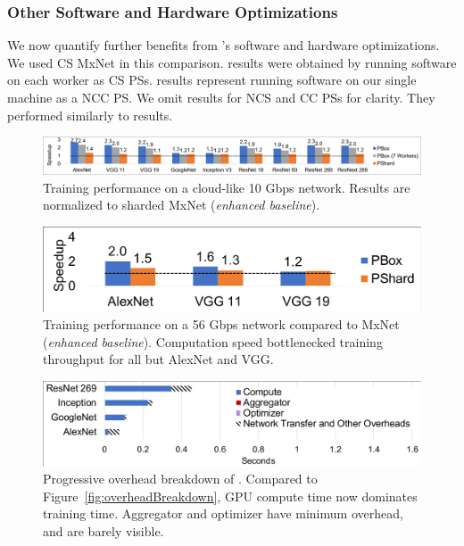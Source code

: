 \subsubsection{Other Software and Hardware Optimizations}
We now quantify further benefits from \phub{}'s software and hardware optimizations. 
We used CS MxNet in this comparison.
\pshard{} results were obtained by running \phub software on each worker as CS PSs. \pbox results represent running \phub software on our single \pbox machine as a NCC PS. We omit results for NCS and CC PSs for clarity. They performed similarly to \pbox results.




\begin{figure}[t!]
	\includegraphics[width=\linewidth,trim=4 4 4 4,clip]{Figures/8GbpsRealTraining_SOCC.pdf}
	\caption{Training performance on a cloud-like 10 Gbps network. Results are normalized to sharded MxNet (\textit{enhanced baseline}).}
	\label{fig:real-8gb}
\end{figure}

\begin{figure}[t!]
    \centering
	\includegraphics[width=.5\linewidth,trim=8 4 4 4,clip]{Figures/56GbpsRealTraining_SOCC.pdf}
	\caption{Training performance on a 56 Gbps network compared to MxNet (\textit{enhanced baseline}). Computation speed bottlenecked training throughput for all but AlexNet and VGG.}
	\label{fig:real-56gb}
\end{figure}

\begin{figure}
    \centering
	\includegraphics[width=.7\linewidth,trim=4 2 2 4,clip]{Figures/PHubOverheadBreakdown.pdf}
	\caption{Progressive overhead breakdown of \phub. Compared to Figure~\ref{fig:overheadBreakdown}, GPU compute time now dominates training time. Aggregator and optimizer have minimum overhead, and are barely visible.}
	\label{fig:phubOverheadBreakdown}
\end{figure}

